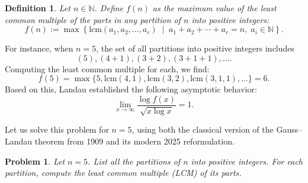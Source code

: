 \documentclass[11pt]{article}
\theoremstyle{plain}
\newtheorem*{definition}{Definition}
\newtheorem*{problem}{Problem}
\begin{document}
\begin{definition}
Let \( n \in \mathbb{N} \). Define \( f(n) \) as the maximum value of the least common multiple of the parts in any partition of \( n \) into positive integers:
\[
f(n) := \max \left\{ \mathrm{lcm}(a_1, a_2, \dots, a_r) \;\middle|\; a_1 + a_2 + \cdots + a_r = n,\; a_i \in \mathbb{N} \right\}.
\] \end{definition}

\noindent
For instance, when \( n = 5 \), the set of all partitions into positive integers includes 
$$(5), (4+1), (3+2), (3+1+1), \dots.$$ 
Computing the least common multiple for each, we find:
\[
f(5) = \max \{5, \mathrm{lcm}(4,1), \mathrm{lcm}(3,2), \mathrm{lcm}(3,1,1), \dots \} = 6.
\]
Based on this, Landau established the following asymptotic behavior:
\[
\lim_{x \to \infty} \frac{\log f(x)}{\sqrt{x \log x}} = 1.
\]

\noindent
Let us solve this problem for \( n = 5 \), using both the classical version of the Gauss–Landau theorem from 1909 and its modern 2025 reformulation.

\begin{problem}
Let \( n = 5 \). List all the partitions of \( n \) into positive integers. For each partition, compute the least common multiple (LCM) of its parts.
\end{problem}
\end{document}
